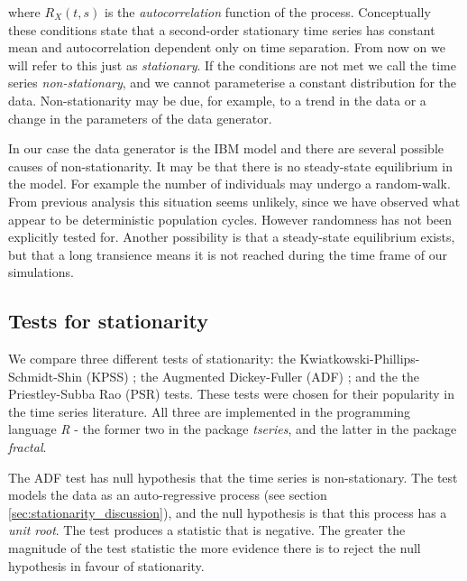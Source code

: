 where $R_X(t,s)$ is the \emph{autocorrelation} function of the process. Conceptually these conditions state that a second-order stationary time series has constant mean and autocorrelation dependent only on time separation. From now on we will refer to this just as \emph{stationary}. If the conditions are not met we call the time series \emph{non-stationary}, and we cannot parameterise a constant distribution for the data. Non-stationarity may be due, for example, to a trend in the data or a change in the parameters of the data generator. 

In our case the data generator is the IBM model and there are several possible causes of non-stationarity. It may be that there is no steady-state equilibrium in the model. For example the number of individuals may undergo a random-walk. From previous analysis this situation seems unlikely, since we have observed what appear to be deterministic population cycles. However randomness has not been explicitly tested for. Another possibility is that a steady-state equilibrium exists, but that a long transience  means it is not reached during the time frame of our simulations.


\subsection{Tests for stationarity}
\label{sec:stat_tests}

We compare three different tests of stationarity: the Kwiatkowski-Phillips-Schmidt-Shin (KPSS) \cite{kwiatkowski1992testing}; the Augmented Dickey-Fuller (ADF) \cite{said1984testing}; and the the Priestley-Subba Rao (PSR) \cite{priestley1969test} tests. These tests were chosen for their popularity in the time series literature. All three are implemented in the programming language \emph{R} \cite{Rlanguage} - the former two in the package \emph{tseries}, and the latter in the package \emph{fractal}.

The ADF test has null hypothesis that the time series is non-stationary. The test models the data as an auto-regressive process (see section \ref{sec:stationarity_discussion}), and the null hypothesis is that this process has a \emph{unit root}. The test produces a statistic that is negative. The greater the magnitude of the test statistic the more evidence there is to reject the null hypothesis in favour of stationarity.


